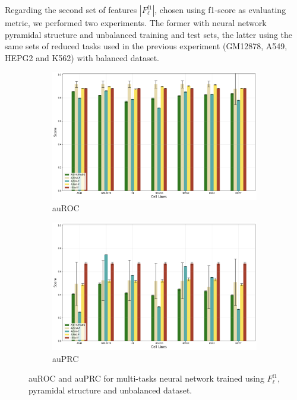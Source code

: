 Regarding the second set of features $|F_\ell^{\textrm{f1}}|$, chosen using f1-score as evaluating metric, we performed two experiments. The former with neural network pyramidal structure and unbalanced training and test sets, the latter using the same sets of reduced tasks used in the previous experiment (GM12878, A549, HEPG2 and K562) with balanced dataset. 
\begin{figure}[!htbp]
    \centering
    \begin{subfigure}[b]{\textwidth}
        \includegraphics[width=\textwidth]{images/results_plots/new_features_auroc.png}
        \caption{auROC}
        \label{fig:auroc_newfeatures}
    \end{subfigure}
    \begin{subfigure}[b]{\textwidth}
        \includegraphics[width=\textwidth]{images/results_plots/new_features_auprc.png}
        \caption{auPRC}
        \label{fig:auprc_newfeatures}
    \end{subfigure}
    \caption{auROC and auPRC for multi-tasks neural network trained using $F_\ell^{\textrm{f1}}$, pyramidal structure and unbalanced dataset.}\label{fig:newfeatures_results}
\end{figure}

